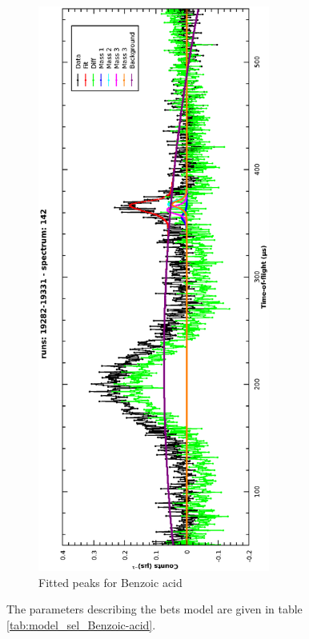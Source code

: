 \documentclass[a4paper]{article}
\begin{document}
\begin{figure}[h!]
  \centering
  \vspace{-60pt}
  \begin{turn}{-90}
    \includegraphics[width=0.68\textwidth]{graphics/model_sel_Benzoic_acid.eps}
  \end{turn}
  \vspace{-60pt}
  \caption{Fitted peaks for Benzoic acid}
  \label{fig:model_sel_Benzoic-acid}
\end{figure}
\FloatBarrier

The parameters describing the bets model are given in table
\ref{tab:model_sel_Benzoic-acid}.
\end{document}
